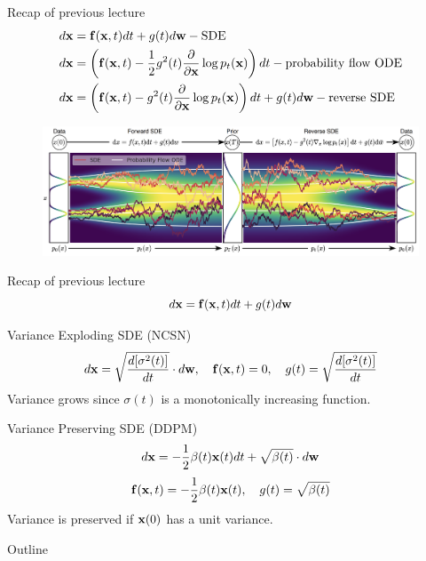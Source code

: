 \begin{frame}{Recap of previous lecture}
	\vspace{-0.5cm}
	\begin{align*}
		d\mathbf{x} &= \mathbf{f}(\mathbf{x}, t) dt + g(t) d \mathbf{w} - \text{SDE} \\
		d\mathbf{x} &= \left(\mathbf{f}(\mathbf{x}, t) -\frac{1}{2} g^2(t) \frac{\partial}{\partial \mathbf{x}} \log p_t(\mathbf{x}) \right) dt - \text{probability flow ODE} \\
		d\mathbf{x} &= \left(\mathbf{f}(\mathbf{x}, t) - g^2(t) \frac{\partial }{\partial \mathbf{x}}\log p_t(\mathbf{x})\right) dt + g(t) d \mathbf{w} - \text{reverse SDE}
	\end{align*}
	\vspace{-0.5cm}
	\begin{figure}
		\includegraphics[width=\linewidth]{figs/sde}
	\end{figure}
\end{frame}
\begin{frame}{Recap of previous lecture}
	\vspace{-0.3cm}
	\[
		d\mathbf{x} = \mathbf{f}(\mathbf{x}, t) dt + g(t) d \mathbf{w}
	\]
	\vspace{-0.3cm}
	\begin{block}{Variance Exploding SDE (NCSN)}
		\vspace{-0.5cm}
		\[
			d \mathbf{x} = \sqrt{\frac{ d [\sigma^2(t)]}{dt}} \cdot d \mathbf{w}, \quad \mathbf{f}(\mathbf{x}, t) = 0, \quad g(t) = \sqrt{\frac{ d [\sigma^2(t)]}{dt}} 
		\]
		Variance grows since $\sigma(t)$ is a monotonically increasing function.
	\end{block}
	\begin{block}{Variance Preserving SDE (DDPM)}
		\vspace{-0.3cm}
		\[
			d \mathbf{x} = - \frac{1}{2} \beta(t) \mathbf{x}(t) dt + \sqrt{\beta(t)} \cdot d \mathbf{w}
		\]
		\[
			\mathbf{f}(\mathbf{x}, t) = - \frac{1}{2} \beta(t) \mathbf{x}(t) , \quad g(t) = \sqrt{\beta(t)} 
		\]
		Variance is preserved if $\mathbf{x}(0)$ has a unit variance.
	\end{block}
\end{frame}
\begin{frame}{Outline}
	\tableofcontents
\end{frame}
